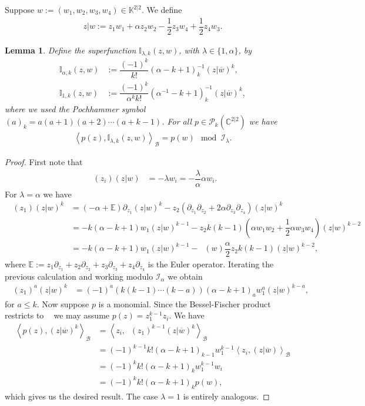 \documentclass{amsart}
\newtheorem{lemma}[theorem]{Lemma}
\numberwithin{theorem}{section}
\theoremstyle{definition}
\theoremstyle{remark}
\def\E{\mathds{E} }
\def\C{\mathds{C} }
\def\K{\mathds{K} }
\DeclareMathOperator{\bessel}{\mathcal B_\lambda}
\DeclareMathOperator{\Fock}{\mc F_\lambda}
\DeclareMathOperator{\Rsq}{R^2_\lambda}
\newcommand{\bfip}[1]{\left<{#1}\right>_\mathcal B}
\newcommand{\pt}[1]{\partial_{#1}}
\newcommand{\ds}[1]{\mathds{#1}}
\newcommand{\mc}[1]{\mathcal{#1}}
\begin{document}
Suppose $w := (w_1,w_2,w_3,w_4) \in \K^{2|2}$. We define
\begin{align*}
z|w := z_1 w_1+\alpha z_2 w_2 - \dfrac{1}{2}z_3 w_4 +\dfrac{1}{2}z_4 w_3.
\end{align*}

\begin{lemma}\label{Lemma rep kernel}
Define the superfunction $\ds I_{\lambda,k}(z,w)$, with $\lambda\in\{1,\alpha\}$, by
\begin{align*}
\ds I_{\alpha,k}(z,w) &:= \dfrac{(-1)^k}{k!}\left(\alpha-k+1\right)_k^{-1}(z|\overline{w})^k,\\
\ds I_{1,k}(z,w) &:= \dfrac{(-1)^k}{\alpha^{k}k!}\left(\alpha^{-1}-k+1\right)_k^{-1}(z|\overline{w})^k,
\end{align*}
where we used the Pochhammer symbol $(a)_k = a(a+1)(a+2)\cdots (a+k-1)$. For all $p\in \mc P_k(\C^{2|2})$ we have
\begin{align*}
\bfip{p(z),\ds I_{\lambda,k}(z,w)} = p(w) \mod  \mc I_\lambda.
\end{align*}
\end{lemma}

\begin{proof}
First note that
\begin{align*}
\bessel(z_i)(z|w) &= -\lambda w_i = -\dfrac{\lambda}{\alpha}\alpha w_i.
\end{align*}
For $\lambda=\alpha$ we have
\begin{align*}
\bessel(z_1)(z|w)^k &= (-\alpha+\E)\pt {z_1} (z|w)^k - z_2(\pt {z_1} \pt {z_2} +2\alpha\pt {z_3}\pt {z_4})(z|w)^k\\
&= -k(\alpha-k+1)w_1(z|w)^{k-1} - z_2k(k-1)(\alpha w_1w_2+\dfrac{1}{2}\alpha w_3 w_4)(z|w)^{k-2}\\
&= -k(\alpha-k+1)w_1(z|w)^{k-1} - \Rsq(w)\dfrac{\alpha}{2} z_2k(k-1) (z|w)^{k-2},
\end{align*}
where $\E := z_1\pt{z_1}+z_2\pt{z_2}+ z_3\pt{z_3}+z_4\pt{z_4}$ is the Euler operator. Iterating the previous calculation and working modulo $\mc I_\alpha$ we obtain
\begin{align*}
\bessel(z_1)^a(z|w)^k &= (-1)^a(k(k-1)\cdots(k-a))(\alpha-k+1)_a w_1^a(z|w)^{k-a},
\end{align*}
for $a\leq k$. Now suppose $p$ is a monomial. Since the Bessel-Fischer product restricts to $\Fock$ we may assume $p(z) = z_1^{k-1}z_i$. We have
\begin{align*}
\bfip{p(z),(z|\overline{w})^k} &= \bfip{z_i,\bessel(z_1)^{k-1}(z|\overline{w})^k}\\
 &= (-1)^{k-1}k!(\alpha-k+1)_{k-1} w_1^{k-1}\bfip{z_i,(z|\overline{w})}\\
 &= (-1)^{k}k!(\alpha-k+1)_{k} w_1^{k-1}w_i\\
 &=(-1)^{k}k!(\alpha-k+1)_{k}p(w),
\end{align*}
which gives us the desired result. The case $\lambda=1$ is entirely analogous.
\qedhere
\end{proof}
\end{document}

